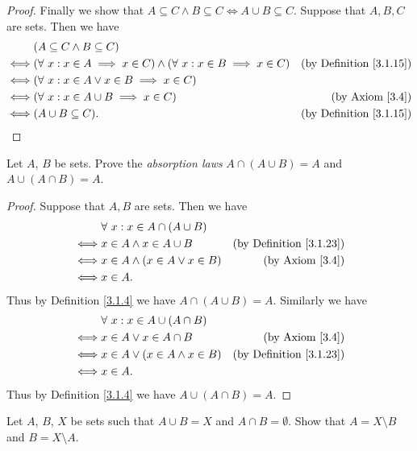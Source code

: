 \begin{proof}
Finally we show that \(A \subseteq C \land B \subseteq C \iff A \cup B \subseteq C\).
Suppose that \(A, B, C\) are sets.
Then we have
\begin{align*}
& (A \subseteq C \land B \subseteq C) \\
\iff & (\forall\ x : x \in A \implies x \in C) \land (\forall\ x : x \in B \implies x \in C) & \text{(by Definition \ref{3.1.15})} \\
\iff & (\forall\ x : x \in A \lor x \in B \implies x \in C) \\
\iff & (\forall\ x : x \in A \cup B \implies x \in C) & \text{(by Axiom \ref{3.4})} \\
\iff & (A \cup B \subseteq C). & \text{(by Definition \ref{3.1.15})}
\end{align*}
\end{proof}

\begin{exercise}\label{ex 3.1.8}
Let \(A\), \(B\) be sets.
Prove the \emph{absorption laws} \(A \cap (A \cup B) = A\) and \(A \cup (A \cap B) = A\).
\end{exercise}

\begin{proof}
Suppose that \(A, B\) are sets.
Then we have
\begin{align*}
& \forall\ x : x \in A \cap (A \cup B) \\
\iff & x \in A \land x \in A \cup B & \text{(by Definition \ref{3.1.23})} \\
\iff & x \in A \land (x \in A \lor x \in B) & \text{(by Axiom \ref{3.4})} \\
\iff & x \in A.
\end{align*}
Thus by Definition \ref{3.1.4} we have \(A \cap (A \cup B) = A\).
Similarly we have
\begin{align*}
& \forall\ x : x \in A \cup (A \cap B) \\
\iff & x \in A \lor x \in A \cap B & \text{(by Axiom \ref{3.4})} \\
\iff & x \in A \lor (x \in A \land x \in B) & \text{(by Definition \ref{3.1.23})} \\
\iff & x \in A.
\end{align*}
Thus by Definition \ref{3.1.4} we have \(A \cup (A \cap B) = A\).
\end{proof}

\begin{exercise}\label{ex 3.1.9}
Let \(A\), \(B\), \(X\) be sets such that \(A \cup B = X\) and \(A \cap B = \emptyset\).
Show that \(A = X \setminus B\) and \(B = X \setminus A\).
\end{exercise}

